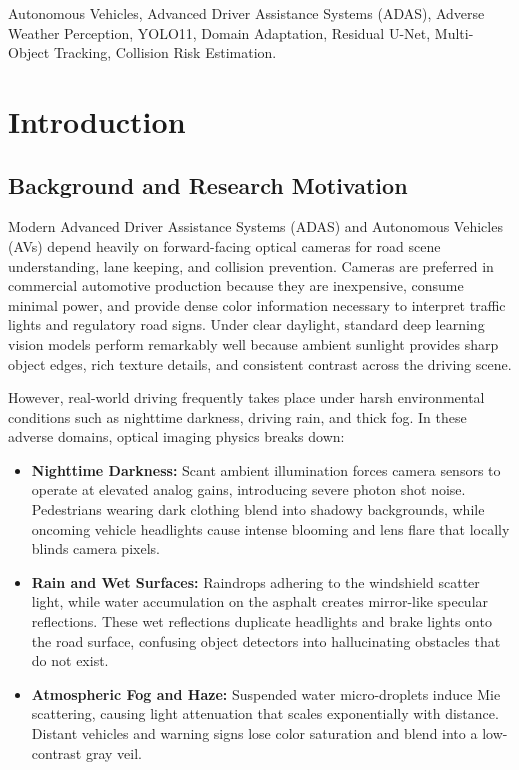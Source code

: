\documentclass[conference]{IEEEtran}
\begin{document}
\begin{IEEEkeywords}
Autonomous Vehicles, Advanced Driver Assistance Systems (ADAS), Adverse Weather Perception, YOLO11, Domain Adaptation, Residual U-Net, Multi-Object Tracking, Collision Risk Estimation.
\end{IEEEkeywords}

\section{Introduction}
\label{sec:introduction}

\subsection{Background and Research Motivation}
Modern Advanced Driver Assistance Systems (ADAS) and Autonomous Vehicles (AVs) depend heavily on forward-facing optical cameras for road scene understanding, lane keeping, and collision prevention. Cameras are preferred in commercial automotive production because they are inexpensive, consume minimal power, and provide dense color information necessary to interpret traffic lights and regulatory road signs. Under clear daylight, standard deep learning vision models perform remarkably well because ambient sunlight provides sharp object edges, rich texture details, and consistent contrast across the driving scene.

However, real-world driving frequently takes place under harsh environmental conditions such as nighttime darkness, driving rain, and thick fog. In these adverse domains, optical imaging physics breaks down:
\begin{itemize}
    \item \textbf{Nighttime Darkness:} Scant ambient illumination forces camera sensors to operate at elevated analog gains, introducing severe photon shot noise. Pedestrians wearing dark clothing blend into shadowy backgrounds, while oncoming vehicle headlights cause intense blooming and lens flare that locally blinds camera pixels.
    \item \textbf{Rain and Wet Surfaces:} Raindrops adhering to the windshield scatter light, while water accumulation on the asphalt creates mirror-like specular reflections. These wet reflections duplicate headlights and brake lights onto the road surface, confusing object detectors into hallucinating obstacles that do not exist.
    \item \textbf{Atmospheric Fog and Haze:} Suspended water micro-droplets induce Mie scattering, causing light attenuation that scales exponentially with distance. Distant vehicles and warning signs lose color saturation and blend into a low-contrast gray veil.
\end{itemize}
\end{document}

